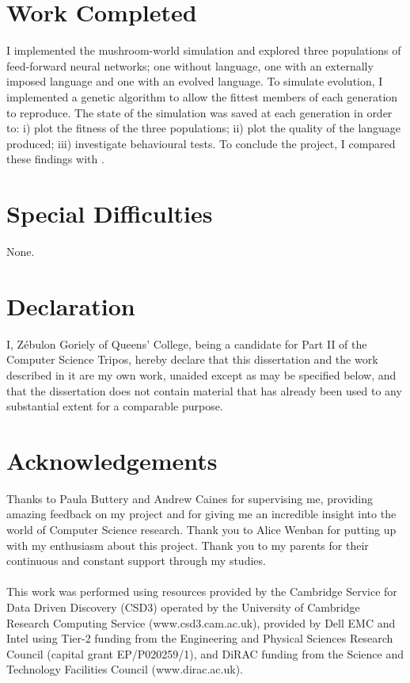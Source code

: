 \documentclass[12pt,a4paper,twoside,openright]{report}
\begin{document}
\section*{Work Completed}

I implemented the mushroom-world simulation and explored three populations of feed-forward neural networks; one without language, one with an externally imposed language and one with an evolved language. To simulate evolution, I implemented a genetic algorithm to allow the fittest members of each generation to reproduce. The state of the simulation was saved at each generation in order to: i) plot the fitness of the three populations; ii) plot the quality of the language produced; iii) investigate behavioural tests. To conclude the project, I compared these findings with \citet{Cangelosi1998}.

\section*{Special Difficulties}

None.
 
\newpage
\section*{Declaration}

I, Z\'ebulon Goriely of Queens' College, being a candidate for Part II of the Computer
Science Tripos, hereby declare
that this dissertation and the work described in it are my own work,
unaided except as may be specified below, and that the dissertation
does not contain material that has already been used to any substantial
extent for a comparable purpose.

\bigskip
{}

\medskip
{}

\tableofcontents

\listoffigures

\newpage
\section*{Acknowledgements}

Thanks to Paula Buttery and Andrew Caines for supervising me, providing amazing feedback on my project and for giving me an incredible insight into the world of Computer Science research. Thank you to Alice Wenban for putting up with my enthusiasm about this project. Thank you to my parents for their continuous and constant support through my studies.
\\
\\
This work was performed using resources provided by the Cambridge Service for Data Driven Discovery (CSD3) operated by the University of Cambridge Research Computing Service (www.csd3.cam.ac.uk), provided by Dell EMC and Intel using Tier-2 funding from the Engineering and Physical Sciences Research Council (capital grant EP/P020259/1), and DiRAC funding from the Science and Technology Facilities Council (www.dirac.ac.uk).
\end{document}
